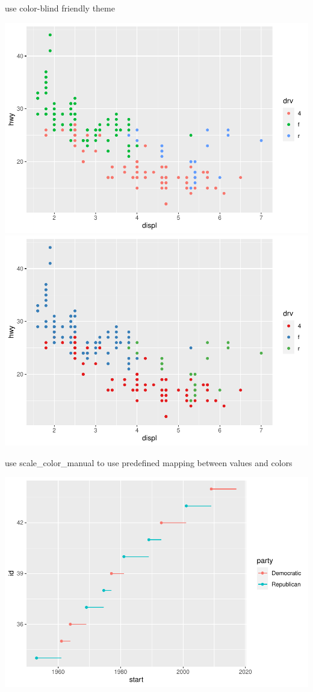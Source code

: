 \documentclass[
]{article}
\begin{document}
use color-blind friendly theme

\includegraphics{rmarkdown_tutorial_files/figure-latex/unnamed-chunk-26-1.pdf}
\includegraphics{rmarkdown_tutorial_files/figure-latex/unnamed-chunk-26-2.pdf}

use scale\_color\_manual to use predefined mapping between values and
colors

\includegraphics{rmarkdown_tutorial_files/figure-latex/unnamed-chunk-27-1.pdf}
\end{document}
